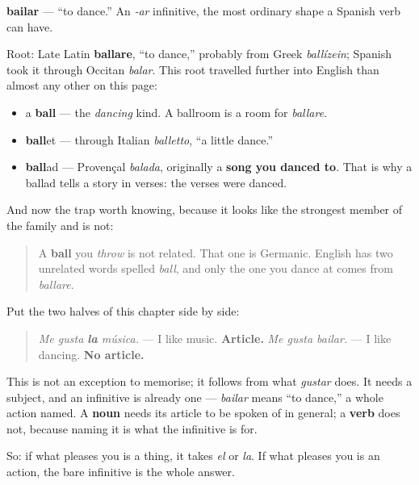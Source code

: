 \begin{cousinweb}
\textbf{bailar} — \textquotedblleft{}to dance.\textquotedblright{} An \emph{-ar} infinitive, the most ordinary shape a Spanish verb can have.

Root: Late Latin \textbf{ballare}, \textquotedblleft{}to dance,\textquotedblright{} probably from Greek \emph{ballízein}; Spanish took it through Occitan \emph{balar}. This root travelled further into English than almost any other on this page:

\begin{itemize}
\raggedright
  \item a \textbf{ball} — the \emph{dancing} kind. A ballroom is a room for \emph{ballare}.
  \item \textbf{ball}et — through Italian \emph{balletto}, \textquotedblleft{}a little dance.\textquotedblright{}
  \item \textbf{ball}ad — Provençal \emph{balada}, originally a \textbf{song you danced to}. That is why a ballad tells a story in verses: the verses were danced.
\end{itemize}

And now the trap worth knowing, because it looks like the strongest member of the family and is not:

\begin{quote}
A \textbf{ball} you \emph{throw} is not related. That one is Germanic. English has two unrelated words spelled \emph{ball}, and only the one you dance at comes from \emph{ballare}.
\end{quote}
\end{cousinweb}

\begin{grammarlens}[title={Grammar Lens: where the article rule switches off}]
Put the two halves of this chapter side by side:

\begin{quote}
\emph{Me gusta \textbf{la} música.} — I like music. \textbf{Article.} \emph{Me gusta bailar.} — I like dancing. \textbf{No article.}
\end{quote}

This is not an exception to memorise; it follows from what \emph{gustar} does. It needs a subject, and an infinitive is already one — \emph{bailar} means \textquotedblleft{}to dance,\textquotedblright{} a whole action named. A \textbf{noun} needs its article to be spoken of in general; a \textbf{verb} does not, because naming it is what the infinitive is for.

So: if what pleases you is a thing, it takes \emph{el} or \emph{la}. If what pleases you is an action, the bare infinitive is the whole answer.
\end{grammarlens}

